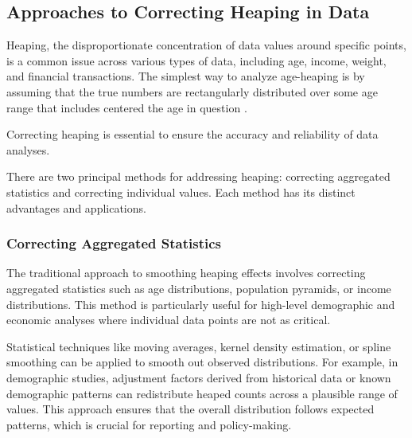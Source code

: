 \documentclass[pdflatex,sn-mathphys-num]{sn-jnl}%
\theoremstyle{thmstyleone}%
\theoremstyle{thmstyletwo}%
\theoremstyle{thmstylethree}%
\begin{document}
%






\subsection{Approaches to Correcting Heaping in Data}

Heaping, the disproportionate concentration of data values around specific points, is a common issue across various types of data, including age, income, weight, and financial transactions. 
The simplest way to analyze age-heaping is by assuming that the true numbers are rectangularly distributed over some age range that includes centered the age in question \citep{hobbs2004}.



Correcting heaping is essential to ensure the accuracy and reliability of data analyses. 



There are two principal methods for addressing heaping: correcting aggregated statistics and correcting individual values. Each method has its distinct advantages and applications.

\subsubsection{Correcting Aggregated Statistics}

The traditional approach to smoothing heaping effects involves correcting aggregated statistics such as age distributions, population pyramids, or income distributions. This method is particularly useful for high-level demographic and economic analyses where individual data points are not as critical.

Statistical techniques like moving averages, kernel density estimation, or spline smoothing can be applied to smooth out observed distributions. For example, in demographic studies, adjustment factors derived from historical data or known demographic patterns can redistribute heaped counts across a plausible range of values. This approach ensures that the overall distribution follows expected patterns, which is crucial for reporting and policy-making.
\end{document}
